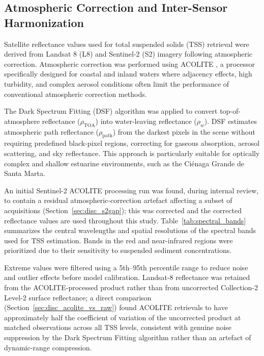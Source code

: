 \documentclass[remotesensing,article,submit,pdftex,moreauthors]{Definitions/mdpi}
\begin{document}
\subsection{Atmospheric Correction and Inter-Sensor Harmonization}
\label{sec:atmCorrection}

Satellite reflectance values used for total suspended solids (TSS) retrieval were derived from Landsat 8 (L8) and Sentinel-2 (S2) imagery following atmospheric correction. Atmospheric correction was performed using ACOLITE \cite{Vanhellemont2015, Vanhellemont2019}, a processor specifically designed for coastal and inland waters where adjacency effects, high turbidity, and complex aerosol conditions often limit the performance of conventional atmospheric correction methods.

The Dark Spectrum Fitting (DSF) algorithm was applied to convert top-of-atmosphere reflectance ($\rho_{\text{TOA}}$) into water-leaving reflectance ($\rho_{w}$). DSF estimates atmospheric path reflectance ($\rho_{\text{path}}$) from the darkest pixels in the scene without requiring predefined black-pixel regions, correcting for gaseous absorption, aerosol scattering, and sky reflectance. This approach is particularly suitable for optically complex and shallow estuarine environments, such as the Ciénaga Grande de Santa Marta.

An initial Sentinel-2 ACOLITE processing run was found, during internal review, to contain a residual atmospheric-correction artefact affecting a subset of acquisitions (Section~\ref{sec:disc_s2gap}); this was corrected and the corrected reflectance values are used throughout this study. Table~\ref{tab:spectral_bands} summarizes the central wavelengths and spatial resolutions of the spectral bands used for TSS estimation. Bands in the red and near-infrared regions were prioritized due to their sensitivity to suspended sediment concentrations.

Extreme values were filtered using a 5th--95th percentile range to reduce noise and outlier effects before model calibration. Landsat-8 reflectance was retained from the ACOLITE-processed product rather than from uncorrected Collection-2 Level-2 surface reflectance; a direct comparison (Section~\ref{sec:disc_acolite_vs_raw}) found ACOLITE retrievals to have approximately half the coefficient of variation of the uncorrected product at matched observations across all TSS levels, consistent with genuine noise suppression by the Dark Spectrum Fitting algorithm rather than an artefact of dynamic-range compression.
\end{document}

